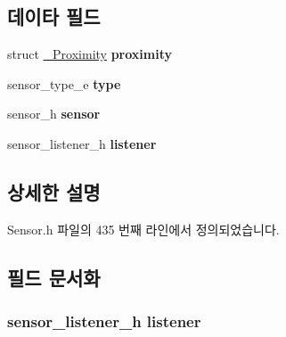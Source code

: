 \subsection*{데이타 필드}
\begin{DoxyCompactItemize}
\item 
\hypertarget{struct___proximity_extend_a79740711df66cd887ecab71528fc1f70}{struct \hyperlink{struct___proximity}{\-\_\-\-Proximity} {\bfseries proximity}}\label{struct___proximity_extend_a79740711df66cd887ecab71528fc1f70}

\item 
\hypertarget{struct___proximity_extend_abffb09766da2fc510a79bb51f82a36e1}{sensor\-\_\-type\-\_\-e {\bfseries type}}\label{struct___proximity_extend_abffb09766da2fc510a79bb51f82a36e1}

\item 
\hypertarget{struct___proximity_extend_a5bae9b7801bc3808411925cde81d3f26}{sensor\-\_\-h {\bfseries sensor}}\label{struct___proximity_extend_a5bae9b7801bc3808411925cde81d3f26}

\item 
\hypertarget{struct___proximity_extend_aa977dfb866b24fd7d9a20a9a01b2fd1f}{sensor\-\_\-listener\-\_\-h {\bfseries listener}}\label{struct___proximity_extend_aa977dfb866b24fd7d9a20a9a01b2fd1f}

\end{DoxyCompactItemize}


\subsection{상세한 설명}


Sensor.\-h 파일의 435 번째 라인에서 정의되었습니다.



\subsection{필드 문서화}
\hypertarget{struct___proximity_extend_aa977dfb866b24fd7d9a20a9a01b2fd1f}{
\subsubsection[{listener}]{\setlength{\rightskip}{0pt plus 5cm}sensor\-\_\-listener\-\_\-h listener}}\label{struct___proximity_extend_aa977dfb866b24fd7d9a20a9a01b2fd1f}


